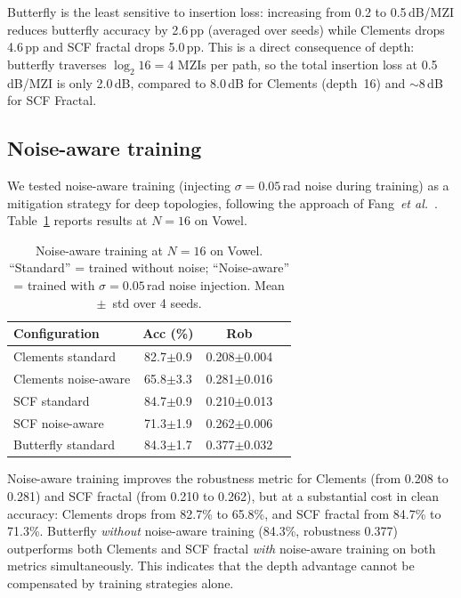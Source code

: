 \documentclass[11pt,a4paper]{article}
\begin{document}
Butterfly is the least sensitive to insertion loss: increasing from 0.2 to
0.5\,dB/MZI reduces butterfly accuracy by 2.6\,pp (averaged over seeds) while
Clements drops 4.6\,pp and SCF fractal drops 5.0\,pp.  This is a direct
consequence of depth: butterfly traverses $\log_2 16 = 4$ MZIs per path, so
the total insertion loss at 0.5\,dB/MZI is only 2.0\,dB, compared to 8.0\,dB
for Clements (depth~16) and ${\sim}8$\,dB for SCF Fractal.


\subsection{Noise-aware training}
\label{sec:nat}

We tested noise-aware training (injecting $\sigma = 0.05$\,rad noise during
training) as a mitigation strategy for deep topologies, following the approach
of Fang~\textit{et al.}~\cite{fang2019}.  Table~\ref{tab:nat} reports results
at $N{=}16$ on Vowel.

\begin{table}[H]
\centering
\caption{Noise-aware training at $N{=}16$ on Vowel.  ``Standard'' = trained
without noise; ``Noise-aware'' = trained with $\sigma = 0.05$\,rad noise injection.
Mean $\pm$~std over 4 seeds.}
\label{tab:nat}
\begin{tabular}{lccc}
\toprule
Configuration & Acc (\%) & Rob \\
\midrule
Clements standard     & 82.7$\pm$0.9 & 0.208$\pm$0.004 \\
Clements noise-aware  & 65.8$\pm$3.3 & 0.281$\pm$0.016 \\
SCF standard          & 84.7$\pm$0.9 & 0.210$\pm$0.013 \\
SCF noise-aware       & 71.3$\pm$1.9 & 0.262$\pm$0.006 \\
Butterfly standard    & 84.3$\pm$1.7 & 0.377$\pm$0.032 \\
\bottomrule
\end{tabular}
\end{table}

Noise-aware training improves the robustness metric for Clements (from 0.208 to
0.281) and SCF fractal (from 0.210 to 0.262), but at a substantial cost in clean
accuracy: Clements drops from 82.7\% to 65.8\%, and SCF fractal from 84.7\% to
71.3\%.  Butterfly \emph{without} noise-aware training (84.3\%, robustness 0.377)
outperforms both Clements and SCF fractal \emph{with} noise-aware training on both
metrics simultaneously.  This indicates that the depth advantage cannot be
compensated by training strategies alone.
\end{document}
